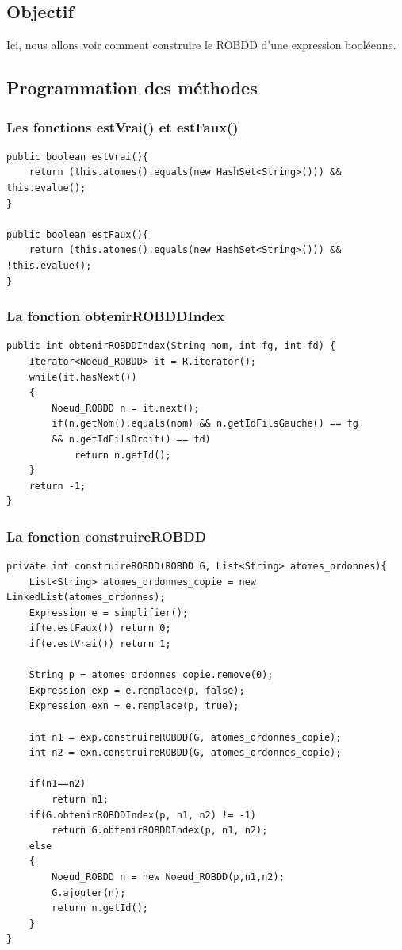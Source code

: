 \documentclass{article}
\begin{document}
\subsection{Objectif}
Ici, nous allons voir comment construire le ROBDD d'une expression booléenne.
\subsection{Programmation des méthodes}
\subsubsection{Les fonctions estVrai() et estFaux()}
\begin{verbatim}
public boolean estVrai(){
	return (this.atomes().equals(new HashSet<String>())) && this.evalue();
}

public boolean estFaux(){
	return (this.atomes().equals(new HashSet<String>())) && !this.evalue();
}
\end{verbatim}
\subsubsection{La fonction obtenirROBDDIndex}
\begin{verbatim}
public int obtenirROBDDIndex(String nom, int fg, int fd) {
	Iterator<Noeud_ROBDD> it = R.iterator();
	while(it.hasNext())
	{
		Noeud_ROBDD n = it.next();
		if(n.getNom().equals(nom) && n.getIdFilsGauche() == fg 
		&& n.getIdFilsDroit() == fd)
			return n.getId();
	}
	return -1;
}
\end{verbatim}
\subsubsection{La fonction construireROBDD}
\begin{verbatim}
private int construireROBDD(ROBDD G, List<String> atomes_ordonnes){
	List<String> atomes_ordonnes_copie = new LinkedList(atomes_ordonnes);
	Expression e = simplifier();
	if(e.estFaux()) return 0;
	if(e.estVrai()) return 1;
	
	String p = atomes_ordonnes_copie.remove(0);
	Expression exp = e.remplace(p, false);
	Expression exn = e.remplace(p, true);
	
	int n1 = exp.construireROBDD(G, atomes_ordonnes_copie);
	int n2 = exn.construireROBDD(G, atomes_ordonnes_copie);
	
	if(n1==n2)
		return n1;
	if(G.obtenirROBDDIndex(p, n1, n2) != -1)
		return G.obtenirROBDDIndex(p, n1, n2);
	else
	{
		Noeud_ROBDD n = new Noeud_ROBDD(p,n1,n2);
		G.ajouter(n);
		return n.getId();
	}
}
\end{verbatim}
\end{document}
